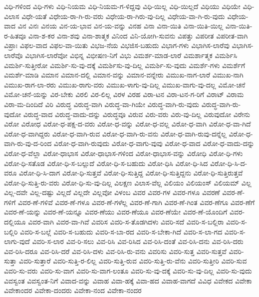 {ವಿಧಿ-ಗಳಿಂದ
ವಿಧಿ-ಗಳು
ವಿಧಿ-ನಿಯಮ
ವಿಧಿ-ನಿಯಮ-ಗ-ಳಿದ್ದವು
ವಿಧಿ-ಯಿಲ್ಲ
ವಿಧಿ-ಯಿಲ್ಲದೆ
ವಿಧಿಯು
ವಿಧಿಯೇ
ವಿಧಿ-ವಿಲಾಸ
ವಿಧೇ-ಯತೆ
ವಿಧೇಯ-ರಾ-ಗಿ-ರು-ವರು
ವಿಧೇಯ-ರಾ-ಗಿರು-ವು-ದಿಲ್ಲ
ವಿಧೇಯ-ವಾ-ಗಿ-ರು-ವುದು
ವಿಧೇಯ-ವಾದ
ವಿನ
ವಿನಃ
ವಿನಯ
ವಿನ-ಯ-ಭಾವ
ವಿನ-ಯ-ವನ್ನು
ವಿನಹ
ವಿನಾ
ವಿನಾ-ಯಿತಿ
ವಿನಾ-ಯಿತಿ-ಯಿಲ್ಲ
ವಿನಾ-ಯಿತಿ-ರ-ಹಿತವೂ
ವಿನಾ-ಶ-ಕರ
ವಿನಾ-ಶವು
ವಿನಾ-ಶಾತ್ಮಕ
ವಿನಿಂದ
ವಿನಿ-ಯೋಗಿ-ಸುವನು
ವಿಪತ್ತು
ವಿಪರೀತ
ವಿಪರೀತ-ವಾಗಿ
ವಿಪ್ರಾಃ
ವಿಫಲ-ವಾದ
ವಿಫಲ-ವಾ-ಯಿತು
ವಿಭಜ-ನೆಯ
ವಿಭಜಿಸ-ಬಹುದು
ವಿಭಾಗ-ಗಳು
ವಿಭಾಗಿಸ-ಲಾರೆವು
ವಿಭಾಗಿಸ-ಲಾರೆವೊ
ವಿಭಾಗಿಸ-ಲಾರೆವೋ
ವಿಭಿನ್ನ
ವಿಭೀಷಣ-ನಿಗೆ
ವಿಭು
ವಿಮರ್ಶ-ಮಾಡ-ಲಾರೆ
ವಿಮರ್ಶಾತ್ಮಕ
ವಿಮರ್ಶಿಸಿ
ವಿಮರ್ಶಿ-ಸುತ್ತೀರೋ
ವಿಮರ್ಶಿ-ಸು-ವು-ದಕ್ಕೆ
ವಿಮರ್ಶಿಸು-ವು-ದಿಲ್ಲ
ವಿಮರ್ಶಿ-ಸು-ವುದು
ವಿಮರ್ಶೆ-ಗಳು
ವಿಮರ್ಶೆಗೆ
ವಿಮರ್ಶೆ-ಮಾಡಿ
ವಿಮಾನ
ವಿಮಾನ-ದಲ್ಲಿ
ವಿಮಾನ-ವನ್ನು
ವಿಮಾನ-ವನ್ನೇರು
ವಿಮುಖ-ನಾಗ-ಲಾರೆ
ವಿಮುಖ-ನಾಗಿ
ವಿಮುಖ-ರಾಗ-ಲಾ-ರರು
ವಿಮುಖ-ರಾಗು-ವರು
ವಿಮುಖ-ಳಾಗು-ವು-ದಿಲ್ಲ
ವಿಮುಖ-ವಾಗು-ವು-ದಲ್ಲ
ವಿಮೋ-ಚನೆ
ವಿಮೋ-ಚನೆ-ಯನ್ನು
ವಿರ-ಬೇಕು
ವಿರಲಿ
ವಿರ-ಲಿಲ್ಲ
ವಿರಳ
ವಿರಹ
ವಿರಾ-ಟನ
ವಿರಾ-ಟನ-ಗ-ರಿಗೆ
ವಿರಾಟ್
ವಿರಾಮ
ವಿರಾ-ಮ-ದಿಂದಿದೆ
ವಿರಿ
ವಿರುದ್ಧ
ವಿರುದ್ಧ-ವಾಗಿ
ವಿರುದ್ಧ-ವಾ-ಗಿಯೇ
ವಿರುದ್ಧ-ವಾಗಿ-ರು-ವುದು
ವಿರುದ್ಧ-ವಾಗಿ-ರು-ವುದೋ
ವಿರುದ್ಧ-ವಾದ
ವಿರುದ್ಧ-ವಾದು-ದನ್ನು
ವಿರುದ್ಧವೂ
ವಿರುವ
ವಿರು-ವರು
ವಿರು-ವು-ದಿಲ್ಲ
ವಿರುವುದೋ
ವಿರೇನು
ವಿರೋ
ವಿರೋಧ
ವಿರೋ-ಧ-ಪಕ್ಷ-ದ-ವರು
ವಿರೋ-ಧ-ವನ್ನು
ವಿರೋ-ಧ-ವಲ್ಲ
ವಿರೋ-ಧ-ವಾಗಿ
ವಿರೋ-ಧ-ವಾ-ಗಿದೆ
ವಿರೋ-ಧ-ವಾಗಿದ್ದರು
ವಿರೋ-ಧ-ವಾಗಿ-ರುವ
ವಿರೋ-ಧ-ವಾಗಿ-ರು-ವನು
ವಿರೋ-ಧ-ವಾಗಿ-ರುವು-ದನ್ನೆಲ್ಲ
ವಿರೋ-ಧ-ವಾಗಿ-ರು-ವು-ದ-ರಿಂದ
ವಿರೋ-ಧ-ವಾಗಿ-ರುವುದು
ವಿರೋ-ಧ-ವಾಗು-ವುವು
ವಿರೋ-ಧ-ವಾದ
ವಿರೋ-ಧ-ವಾದು-ದನ್ನು
ವಿರೋ-ಧ-ವೆಲ್ಲಾ
ವಿರೋ-ಧಾಭಾಸ
ವಿರೋ-ಧಾಭಾಸ-ಗಳಿಂದ
ವಿರೋ-ಧಾಭಾಸ-ವನ್ನು
ವಿರೋಧಿ
ವಿರೋ-ಧಿ-ಗಳು
ವಿರೋ-ಧಿ-ಸತೊಡ
ವಿರೋ-ಧಿ-ಸ-ಬಲ್ಲುದೆ
ವಿರೋ-ಧಿ-ಸ-ಬಹುದು
ವಿರೋ-ಧಿಸಿ
ವಿರೋ-ಧಿ-ಸಿದ
ವಿರೋ-ಧಿ-ಸಿ-ದ-ವರೂ
ವಿರೋ-ಧಿ-ಸಿ-ದಾಗ
ವಿರೋ-ಧಿ-ಸುತ್ತವೆ
ವಿರೋ-ಧಿ-ಸುತ್ತಿದ್ದ
ವಿರೋ-ಧಿ-ಸುತ್ತಿದ್ದನು
ವಿರೋ-ಧಿ-ಸುತ್ತಿರುತ್ತವೆ
ವಿರೋ-ಧಿ-ಸುತ್ತಿ-ರು-ವರು
ವಿರೋ-ಧಿ-ಸು-ವು-ದಿಲ್ಲ
ವಿಲಕ್ಷಣ
ವಿಲಾಸ-ವೆಲ್ಲ
ವಿಲಿಯಂ
ವಿಲಿಯಂಸ್
ವಿಲಿಯಮ್
ವಿಲ್ಲ
ವಿಲ್ಲ-ದವೇ
ವಿಲ್ಲ-ದಷ್ಟು
ವಿಲ್ಲದೆ
ವಿಲ್ಲದೇ
ವಿಲ್ಲವೋ
ವಿಳಂಬ
ವಿವರ
ವಿವರ-ಗಳ
ವಿವರ-ಗಳೂ
ವಿವರಣೆ
ವಿವರ-ಣೆ-ಗಳಿಗೆ
ವಿವರ-ಣೆ-ಗಳಿವೆ
ವಿವರ-ಣೆ-ಗಳೂ
ವಿವರ-ಣೆ-ಗಳೆಲ್ಲ
ವಿವರ-ಣೆ-ಗಾಗಿ
ವಿವರ-ಣೆ-ಗಿಂತ
ವಿವರ-ಣೆಗೂ
ವಿವರ-ಣೆಗೆ
ವಿವರ-ಣೆ-ಯನ್ನು
ವಿವರ-ಣೆ-ಯನ್ನೂ
ವಿವರ-ಣೆಯು
ವಿವರ-ಣೆಯೂ
ವಿವರ-ಣೆಯೇ
ವಿವರ-ಣೆ-ಯೊಂದಿಗೆ
ವಿವರ-ದಲ್ಲಿಯೂ
ವಿವರ-ವಾಗಿ
ವಿವರ-ವಾ-ಗಿವೆ
ವಿವರಿಸ
ವಿವರಿ-ಸ-ತೊಡಗಿದಳು
ವಿವರಿ-ಸದೆ
ವಿವರಿ-ಸ-ಬಲ್ಲಿರಾ
ವಿವರಿ-ಸ-ಬಲ್ಲಿರಿ
ವಿವರಿ-ಸ-ಬಲ್ಲೆ
ವಿವರಿ-ಸ-ಬಹುದು
ವಿವರಿ-ಸ-ಬಾ-ರದ
ವಿವರಿ-ಸ-ಬೇಕಾ-ಗಿದೆ
ವಿವರಿ-ಸ-ಲಾ-ಗದ
ವಿವರಿ-ಸ-ಲಾಗು-ವುದೆ
ವಿವರಿ-ಸ-ಲಾರ
ವಿವ-ರಿ-ಸಲು
ವಿವ-ರಿಸಿ
ವಿವ-ರಿಸಿದ
ವಿವ-ರಿಸಿ-ದಂತೆ
ವಿವ-ರಿಸಿ-ದನು
ವಿವ-ರಿಸಿ-ದರು
ವಿವ-ರಿಸಿ-ದರೂ
ವಿವ-ರಿಸಿ-ದರೆ
ವಿವ-ರಿಸಿ-ದಳು
ವಿವ-ರಿಸಿ-ರು-ವನು
ವಿವರಿಸು
ವಿವರಿ-ಸುತ್ತ
ವಿವರಿ-ಸುತ್ತವೆ
ವಿವರಿ-ಸುತ್ತಾ
ವಿವರಿ-ಸುತ್ತಾರೆ
ವಿವರಿ-ಸುತ್ತಿ-ರ-ಲಿಲ್ಲ
ವಿವರಿ-ಸುತ್ತಿ-ರುವ
ವಿವರಿ-ಸುತ್ತಿ-ರು-ವೆನು
ವಿವರಿ-ಸುತ್ತೀರಿ
ವಿವರಿ-ಸುವ
ವಿವರಿ-ಸು-ವರು
ವಿವರಿ-ಸು-ವಾಗ
ವಿವರಿ-ಸು-ವಾಗ-ಲಂತೂ
ವಿವರಿ-ಸು-ವು-ದಕ್ಕೆ
ವಿವರಿ-ಸು-ವು-ದಿಲ್ಲ
ವಿವರಿ-ಸು-ವುದು
ವಿವಸ್ವಂತ
ವಿವಸ್ವಂತ-ನಿಗೆ
ವಿವಾದ-ವನ್ನು
ವಿವಾಹ
ವಿವಾ-ಹಕ್ಕೆ
ವಿವಾ-ಹದ
ವಿವಾಹ-ವಾಗದೆ
ವಿವಿಧ
ವಿವೇಕದ
ವಿವೇಕಾ
ವಿವೇಕಾಂದರ
ವಿವೇಕಾ-ದಂದರು
ವಿವೇಕಾ-ನಂದ
ವಿವೇಕಾ-ನಂದರ
}
